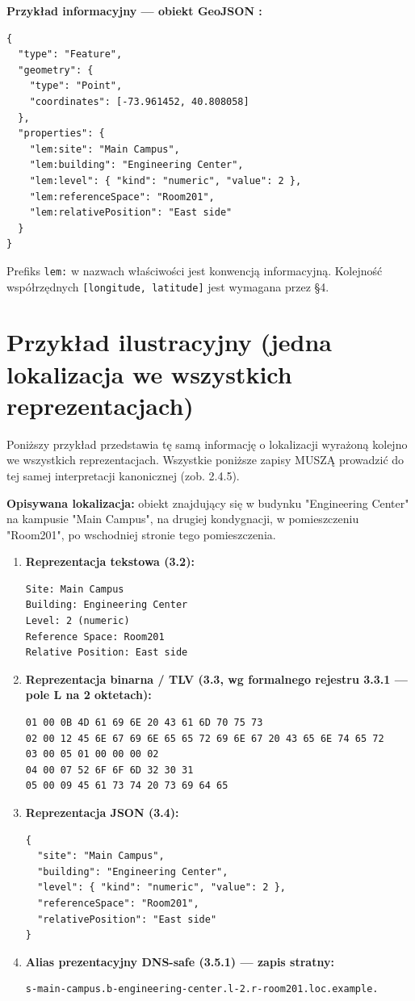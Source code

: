 \noindent \textbf{Przykład informacyjny --- obiekt GeoJSON \cite{RFC7946}:}
\begin{verbatim}
{
  "type": "Feature",
  "geometry": {
    "type": "Point",
    "coordinates": [-73.961452, 40.808058]
  },
  "properties": {
    "lem:site": "Main Campus",
    "lem:building": "Engineering Center",
    "lem:level": { "kind": "numeric", "value": 2 },
    "lem:referenceSpace": "Room201",
    "lem:relativePosition": "East side"
  }
}
\end{verbatim}

\noindent Prefiks \texttt{lem:} w nazwach właściwości jest konwencją informacyjną. Kolejność współrzędnych \texttt{[longitude, latitude]} jest wymagana przez \cite{RFC7946} §4.

\section{Przykład ilustracyjny (jedna lokalizacja we wszystkich reprezentacjach)}
\label{sec:przyklad-ilustracyjny}
Poniższy przykład przedstawia tę samą informację o lokalizacji wyrażoną kolejno we wszystkich reprezentacjach. Wszystkie poniższe zapisy MUSZĄ prowadzić do tej samej interpretacji kanonicznej (zob. 2.4.5).

\noindent \textbf{Opisywana lokalizacja:} obiekt znajdujący się w budynku "Engineering Center" na kampusie "Main Campus", na drugiej kondygnacji, w pomieszczeniu "Room201", po wschodniej stronie tego pomieszczenia.

\begin{enumerate}
    \item \textbf{Reprezentacja tekstowa (3.2):}
\begin{verbatim}
Site: Main Campus
Building: Engineering Center
Level: 2 (numeric)
Reference Space: Room201
Relative Position: East side
\end{verbatim}

    \item \textbf{Reprezentacja binarna / TLV (3.3, wg formalnego rejestru 3.3.1 — pole L na 2 oktetach):}
\begin{verbatim}
01 00 0B 4D 61 69 6E 20 43 61 6D 70 75 73
02 00 12 45 6E 67 69 6E 65 65 72 69 6E 67 20 43 65 6E 74 65 72
03 00 05 01 00 00 00 02
04 00 07 52 6F 6F 6D 32 30 31
05 00 09 45 61 73 74 20 73 69 64 65
\end{verbatim}

    \item \textbf{Reprezentacja JSON (3.4):}
\begin{verbatim}
{
  "site": "Main Campus",
  "building": "Engineering Center",
  "level": { "kind": "numeric", "value": 2 },
  "referenceSpace": "Room201",
  "relativePosition": "East side"
}
\end{verbatim}

    \item \textbf{Alias prezentacyjny DNS-safe (3.5.1) --- zapis stratny:}
\begin{verbatim}
s-main-campus.b-engineering-center.l-2.r-room201.loc.example.
\end{verbatim}
\end{enumerate}

